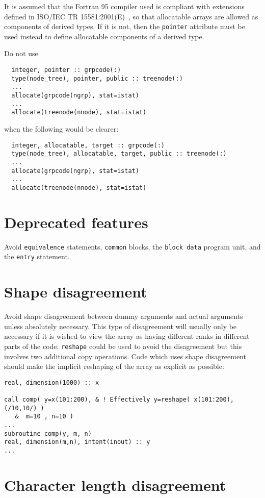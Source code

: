 \documentclass[11pt,twoside,a4paper]{report}
\begin{document}
It is assumed that the Fortran 95 compiler used is compliant with
extensions defined in ISO/IEC TR 15581:2001(E)~\cite{tr15581}, so that
allocatable arrays are allowed as components of derived types. If it
is not, then the \verb|pointer| attribute must be used instead to
define allocatable components of a derived type.

Do not use
{\it 
\begin{verbatim}
  integer, pointer :: grpcode(:)
  type(node_tree), pointer, public :: treenode(:)
  ...
  allocate(grpcode(ngrp), stat=istat)
  ...
  allocate(treenode(nnode), stat=istat)
\end{verbatim}
when the following would be clearer:
\begin{verbatim}
  integer, allocatable, target :: grpcode(:)
  type(node_tree), allocatable, target, public :: treenode(:)
  ...
  allocate(grpcode(ngrp), stat=istat)
  ...
  allocate(treenode(nnode), stat=istat)
\end{verbatim}
}

\section{Deprecated features}

Avoid \texttt{equiv\-alence} statements, \verb|common| blocks,
the \verb|block data| program unit, and the \verb|entry| statement.

\section{Shape disagreement}

Avoid shape disagreement between dummy arguments and actual arguments 
unless absolutely necessary. This type of disagreement will usually
only be necessary if it is wished to view the array as having different
ranks in different parts of the code. \verb|reshape| could be used
to avoid the disagreement but this involves two additional copy
operations. Code which uses shape disagreement should make the 
implicit reshaping of the array as explicit as possible:

\begin{verbatim}
real, dimension(1000) :: x

call comp( y=x(101:200), & ! Effectively y=reshape( x(101:200), (/10,10/) ) 
   &  m=10 , n=10 )
...
subroutine comp(y, m, n)
real, dimension(m,n), intent(inout) :: y
...
\end{verbatim}


\section{Character length disagreement}
\end{document}
